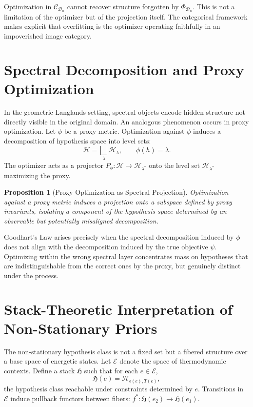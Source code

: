 \documentclass[12pt]{article}
\theoremstyle{plain}
\newtheorem{proposition}[theorem]{Proposition}
\theoremstyle{definition}
\theoremstyle{remark}
\begin{document}
Optimization in $\mathcal{C}_{\mathcal{D}_n}$ cannot recover structure forgotten by $\Phi_{\mathcal{D}_n}$. This is not a limitation of the optimizer but of the projection itself. The categorical framework makes explicit that overfitting is the optimizer operating faithfully in an impoverished image category.

\section{Spectral Decomposition and Proxy Optimization}

In the geometric Langlands setting, spectral objects encode hidden structure not directly visible in the original domain. An analogous phenomenon occurs in proxy optimization. Let $\phi$ be a proxy metric. Optimization against $\phi$ induces a decomposition of hypothesis space into level sets:
\[
\mathcal{H} = \bigsqcup_{\lambda} \mathcal{H}_{\lambda}, \qquad \phi(h) = \lambda.
\]
The optimizer acts as a projector $P_{\phi} : \mathcal{H} \to \mathcal{H}_{\lambda^\ast}$ onto the level set $\mathcal{H}_{\lambda^\ast}$ maximizing the proxy.

\begin{proposition}[Proxy Optimization as Spectral Projection]
Optimization against a proxy metric induces a projection onto a subspace defined by proxy invariants, isolating a component of the hypothesis space determined by an observable but potentially misaligned decomposition.
\end{proposition}

Goodhart's Law arises precisely when the spectral decomposition induced by $\phi$ does not align with the decomposition induced by the true objective $\psi$. Optimizing within the wrong spectral layer concentrates mass on hypotheses that are indistinguishable from the correct ones by the proxy, but genuinely distinct under the process.

\section{Stack-Theoretic Interpretation of Non-Stationary Priors}

The non-stationary hypothesis class is not a fixed set but a fibered structure over a base space of energetic states. Let $\mathcal{E}$ denote the space of thermodynamic contexts. Define a stack $\mathfrak{H}$ such that for each $e \in \mathcal{E}$,
\[
\mathfrak{H}(e) = \mathcal{H}_{\epsilon(e),T(e)},
\]
the hypothesis class reachable under constraints determined by $e$. Transitions in $\mathcal{E}$ induce pullback functors between fibers: $f^\ast : \mathfrak{H}(e_2) \to \mathfrak{H}(e_1)$.
\end{document}
